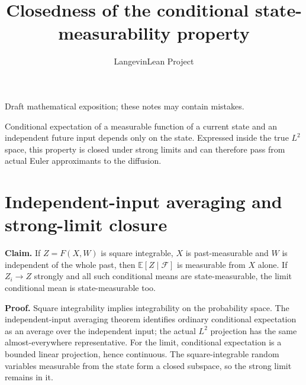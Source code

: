 \documentclass[11pt,a4paper]{article}
\title{\texorpdfstring{Closedness of the conditional state-measurability property}{Closedness of the conditional state-measurability property}}
\author{LangevinLean Project}
\date{}
\begin{document}
\maketitle
Draft mathematical exposition; these notes may contain mistakes.


Conditional expectation of a measurable function of a current state and an independent future input depends only on the state. Expressed inside the true \(L^2\) space, this property is closed under strong limits and can therefore pass from actual Euler approximants to the diffusion.


\section{\texorpdfstring{Independent-input averaging and strong-limit closure}{Independent-input averaging and strong-limit closure}}


\textbf{Claim.} If \(Z=F(X,W)\) is square integrable, \(X\) is past-measurable and \(W\) is independent of the whole past, then \(\mathbb E[Z\mid\mathcal F]\) is measurable from \(X\) alone. If \(Z_i\to Z\) strongly and all such conditional means are state-measurable, the limit conditional mean is state-measurable too.



\textbf{Proof.} Square integrability implies integrability on the probability space. The independent-input averaging theorem identifies ordinary conditional expectation as an average over the independent input; the actual \(L^2\) projection has the same almost-everywhere representative. For the limit, conditional expectation is a bounded linear projection, hence continuous. The square-integrable random variables measurable from the state form a closed subspace, so the strong limit remains in it.
\end{document}
